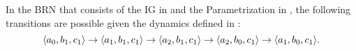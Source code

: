 \begin{example*}
In the BRN that consists of the IG in  and the Parametrization in , the following transitions are possible given the dynamics defined in :
\[\mbox{$\langle a_0, b_1, c_1 \rangle$} \rightarrow \mbox{$\langle a_1, b_1, c_1 \rangle$} \rightarrow \mbox{$\langle a_2, b_1, c_1 \rangle$} \rightarrow
\mbox{$\langle a_2, b_0, c_1 \rangle$} \rightarrow \mbox{$\langle a_1, b_0, c_1 \rangle$}.\]
\end{example*}
